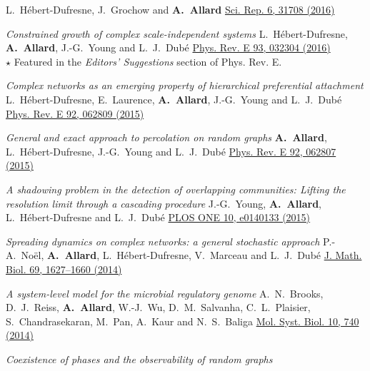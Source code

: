 \documentclass[11pt]{article}
\makeatletter
\newcommand{\reversearabic}[1]{\expandafter\@reversearabic\csname c@#1\endcsname}
\newcommand{\@reversearabic}[1]{%
  \number\numexpr\getrefnumber{this@etaremune@\romannumeral\c@etaremune}-#1+1\relax
}
\newcounter{etaremune}
\newenvironment{etaremune}[1][]{%
  \stepcounter{etaremune}%
  \begin{enumerate}[label=\reversearabic*.,#1]%
}{%
  \edef\@currentlabel{\the\csname c@\@enumctr\endcsname}%
  \label{this@etaremune@\romannumeral\c@etaremune}%
  \end{enumerate}%
}
\makeatother
\begin{document}
\begin{etaremune}[itemsep=0.5em, label={[A\reversearabic*]}]
{  L.~H\'ebert-Dufresne, J.~Grochow and \textbf{A.~Allard}\split
  \href{https://doi.org/10.1038/srep31708}{Sci. Rep. 6, 31708 (2016)}}
%
  \item \parbox[t]{\textwidth-30pt}{\textit{Constrained growth of complex scale-independent systems}\split
  L.~H\'ebert-Dufresne, \textbf{A.~Allard}, J.-G.~Young and L.~J.~Dub\'e\split
  \href{https://doi.org/10.1103/PhysRevE.93.032304}{Phys. Rev. E 93, 032304 (2016)}\\
  {\footnotesize $\star$ Featured in the \textit{Editors' Suggestions} section of Phys. Rev. E.}}
%
  \item \parbox[t]{\textwidth-30pt}{\textit{Complex networks as an emerging property of hierarchical preferential attachment}\split
  L.~H\'ebert-Dufresne, E.~Laurence, \textbf{A.~Allard}, J.-G.~Young and L.~J.~Dub\'e\split
  \href{https://doi.org/10.1103/PhysRevE.92.062809}{Phys. Rev. E 92, 062809 (2015)}}
%
  \item \parbox[t]{\textwidth-30pt}{\textit{General and exact approach to percolation on random graphs}\split
  \textbf{A.~Allard}, L.~H\'ebert-Dufresne, J.-G.~Young and L.~J.~Dub\'e\split
  \href{https://doi.org/10.1103/PhysRevE.92.062807}{Phys. Rev. E 92, 062807 (2015)}}
%
  \item \parbox[t]{\textwidth-30pt}{\textit{A shadowing problem in the detection of overlapping communities: Lifting the resolution limit through a cascading procedure}\split
  J.-G.~Young, \textbf{A.~Allard}, L.~H\'ebert-Dufresne and L.~J.~Dub\'e\split
  \href{https://doi.org/10.1371/journal.pone.0140133}{PLOS ONE 10, e0140133 (2015)}}
%
  \item \parbox[t]{\textwidth-30pt}{\textit{Spreading dynamics on complex networks: a general stochastic approach}\split
  P.-A.~No\"el, \textbf{A.~Allard}, L.~H\'ebert-Dufresne, V.~Marceau and L.~J.~Dub\'e\split
  \href{https://doi.org/10.1007/s00285-013-0744-9}{J. Math. Biol. 69, 1627--1660 (2014)}}
%
  \item \parbox[t]{\textwidth-30pt}{\textit{A system-level model for the microbial regulatory genome}\split
  A.~N.~Brooks, D.~J.~Reiss, \textbf{A.~Allard}, W.-J.~Wu, D.~M.~Salvanha, C.~L.~Plaisier, S.~Chandrasekaran, M.~Pan, A.~Kaur and N.~S.~Baliga\split
  \href{https://doi.org/10.15252/msb.20145160}{Mol. Syst. Biol. 10, 740 (2014)}}
%
  \item \parbox[t]{\textwidth-30pt}{\textit{Coexistence of phases and the observability of random graphs}\split
}
\end{etaremune}
\end{document}
